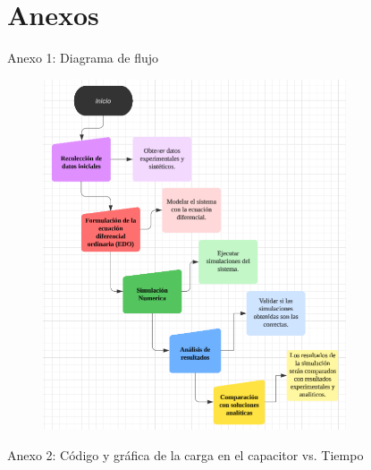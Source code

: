 


\section{Anexos}
\vspace*{2cm}
Anexo 1: Diagrama de flujo
\begin{figure}[H]
    \centering
    \includegraphics[width=0.8\textwidth]{5.png}
\end{figure}
\newpage
Anexo 2: Código y gráfica de la carga en el capacitor vs. Tiempo

